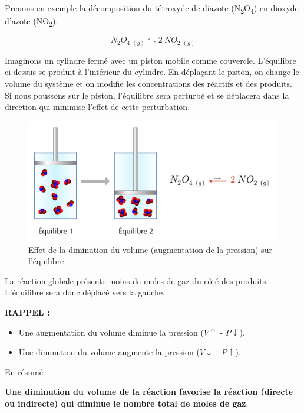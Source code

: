 \documentclass[
  11pt,
  a4paper,
  openany]{book}
\providecommand{\tightlist}{%
  \setlength{\itemsep}{0pt}\setlength{\parskip}{0pt}}
\begin{document}
Prenons en exemple la décomposition du tétroxyde de diazote (N\textsubscript{2}O\textsubscript{4}) en dioxyde d'azote (NO\textsubscript{2}).

\[
  N_2O_4\ {}_{(g)} \leftrightharpoons 2\ NO_2\ {}_{(g)}
\]

Imaginons un cylindre fermé avec un piston mobile comme couvercle. L'équilibre ci-dessus se produit à l'intérieur du cylindre. En déplaçant le piston, on change le volume du système et on modifie les concentrations des réactifs et des produits. Si nous poussons sur le piston, l'équilibre sera perturbé et se déplacera dans la direction qui minimise l'effet de cette perturbation.

\clearpage

\begin{figure}

{\centering \includegraphics[width=0.75\linewidth]{images/equilibres-pressions-1} 

}

\caption{Effet de la diminution du volume (augmentation de la pression) sur l'équilibre}\label{fig:equilibres-pressions-1}
\end{figure}

La réaction globale présente moins de moles de gaz du côté des produits. L'équilibre sera donc déplacé vers la gauche.

\textbf{RAPPEL :}

\begin{itemize}
\tightlist
\item
  Une augmentation du volume diminue la pression (\(V \uparrow\) - \(P \downarrow\)).
\item
  Une diminution du volume augmente la pression (\(V \downarrow\) - \(P \uparrow\)).
\end{itemize}

En résumé :

\textbf{Une diminution du volume de la réaction favorise la réaction (directe ou indirecte) qui diminue le nombre total de moles de gaz}.
\end{document}
